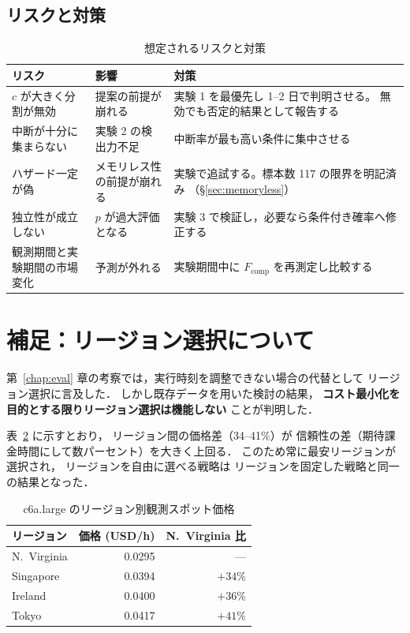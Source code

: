 \documentclass[11pt,a4paper]{ltjsreport}
\newcommand{\Fcomp}{F_{\mathrm{comp}}}
\begin{document}
\subsection{リスクと対策}

\begin{table}[htbp]
\centering
\caption{想定されるリスクと対策}
\label{tab:risks}
\small
\begin{tabularx}{\textwidth}{@{}XXX@{}}
\toprule
リスク & 影響 & 対策 \\
\midrule
$c$ が大きく分割が無効
  & 提案の前提が崩れる
  & 実験 1 を最優先し 1--2 日で判明させる。
    無効でも否定的結果として報告する \\
\addlinespace
中断が十分に集まらない
  & 実験 2 の検出力不足
  & 中断率が最も高い条件に集中させる \\
\addlinespace
ハザード一定が偽
  & メモリレス性の前提が崩れる
  & 実験で追試する。標本数 117 の限界を明記済み
    （\S\ref{sec:memoryless}） \\
\addlinespace
独立性が成立しない
  & $p$ が過大評価となる
  & 実験 3 で検証し，必要なら条件付き確率へ修正する \\
\addlinespace
観測期間と実験期間の市場変化
  & 予測が外れる
  & 実験期間中に $\Fcomp$ を再測定し比較する \\
\bottomrule
\end{tabularx}
\end{table}


\section{補足：リージョン選択について}

第~\ref{chap:eval} 章の考察では，実行時刻を調整できない場合の代替として
リージョン選択に言及した．
しかし既存データを用いた検討の結果，
\textbf{コスト最小化を目的とする限りリージョン選択は機能しない}
ことが判明した．

表~\ref{tab:region_price} に示すとおり，
リージョン間の価格差（34--41\%）が
信頼性の差（期待課金時間にして数パーセント）を大きく上回る．
このため常に最安リージョンが選択され，
リージョンを自由に選べる戦略は
リージョンを固定した戦略と同一の結果となった．

\begin{table}[htbp]
\centering
\caption{c6a.large のリージョン別観測スポット価格}
\label{tab:region_price}
\small
\begin{tabular}{@{}lrr@{}}
\toprule
リージョン & 価格 (USD/h) & N.~Virginia 比 \\
\midrule
N.~Virginia & 0.0295 & --- \\
Singapore   & 0.0394 & $+34\%$ \\
Ireland     & 0.0400 & $+36\%$ \\
Tokyo       & 0.0417 & $+41\%$ \\
\bottomrule
\end{tabular}
\end{table}
\end{document}
